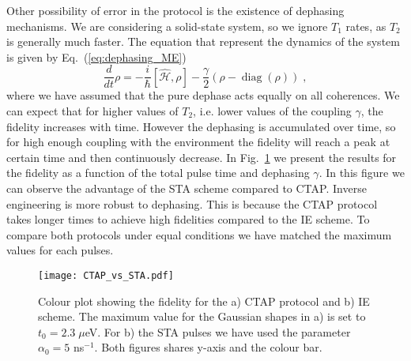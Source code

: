 Other possibility of error in the protocol is the existence of dephasing mechanisms. We are considering a solid-state system, so we ignore $T_1$ rates, as $T_2$ is generally much faster. The equation that represent the dynamics of the system is given by Eq.~(\ref{eq:dephasing_ME})
\begin{equation}
	\frac{d}{dt}\rho=-\frac{i}{\hbar}[\hat{\mathcal{H}},\rho]-\frac{\gamma}{2}(\rho-\operatorname{diag}(\rho))\; ,
\end{equation}
where we have assumed that the pure dephase acts equally on all coherences. We can expect that for higher values of $T_2$, i.e. lower values of the coupling $\gamma$, the fidelity increases with time. However the dephasing is accumulated over time, so for high enough coupling with the environment the fidelity will reach a peak at certain time and then continuously decrease. In Fig.~\ref{fig:CTAP_vs_STA} we present the results for the fidelity as a function of the total pulse time and dephasing $\gamma$. In this figure we can observe the advantage of the STA scheme compared to CTAP. Inverse engineering is more robust to dephasing. This is because the CTAP protocol takes longer times to achieve high fidelities compared to the IE scheme. To compare both protocols under equal conditions we have matched the maximum values for each pulses. 
\begin{figure}[!htb]
	\centering
	\texttt{[image: CTAP\_vs\_STA.pdf]}
	\caption{Colour plot showing the fidelity for the a) CTAP protocol and b) IE scheme. The maximum value for the Gaussian shapes in a) is set to $t_0=2.3\; \mu$eV. For b) the STA pulses we have used the parameter $\alpha_0=5$ ns$^{-1}$. Both figures shares y-axis and the colour bar.}
	\label{fig:CTAP_vs_STA}
\end{figure}

